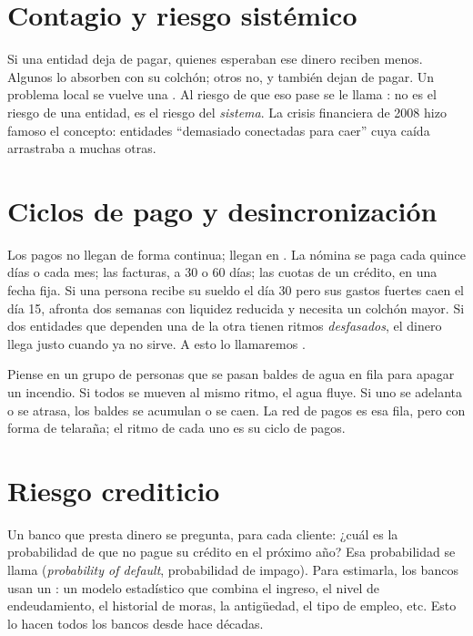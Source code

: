 \section{Contagio y riesgo sistémico}
Si una entidad deja de pagar, quienes esperaban ese dinero reciben menos. Algunos lo
absorben con su colchón; otros no, y también dejan de pagar. Un problema local se
vuelve una . Al riesgo de que eso pase se le llama : no es el riesgo de una entidad, es el riesgo del \emph{sistema}. La crisis
financiera de 2008 hizo famoso el concepto: entidades ``demasiado conectadas para
caer'' cuya caída arrastraba a muchas otras.

\section{Ciclos de pago y desincronización}
Los pagos no llegan de forma continua; llegan en . La nómina se paga
cada quince días o cada mes; las facturas, a 30 o 60 días; las cuotas de un crédito,
en una fecha fija. Si una persona recibe su sueldo el día 30 pero sus gastos fuertes
caen el día 15, afronta dos semanas con liquidez reducida y necesita un colchón mayor. Si dos
entidades que dependen una de la otra tienen ritmos \emph{desfasados}, el dinero
llega justo cuando ya no sirve. A esto lo llamaremos .

\begin{idea}[Analogía]
Piense en un grupo de personas que se pasan baldes de agua en fila para apagar un
incendio. Si todos se mueven al mismo ritmo, el agua fluye. Si uno se adelanta o se
atrasa, los baldes se acumulan o se caen. La red de pagos es esa fila, pero con forma
de telaraña; el ritmo de cada uno es su ciclo de pagos.
\end{idea}

\section{Riesgo crediticio}
Un banco que presta dinero se pregunta, para cada cliente: ¿cuál es la probabilidad de
que no pague su crédito en el próximo año? Esa probabilidad se llama 
(\emph{probability of default}, probabilidad de impago). Para estimarla, los bancos
usan un : un modelo estadístico que combina el ingreso, el
nivel de endeudamiento, el historial de moras, la antigüedad, el tipo de empleo, etc.
Esto lo hacen todos los bancos desde hace décadas.

